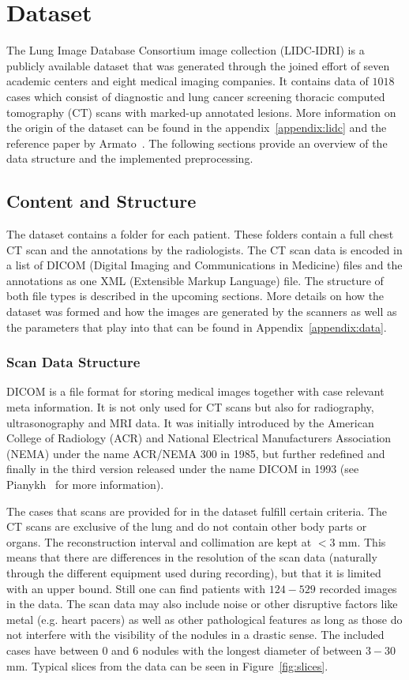 \documentclass[../Thesis.tex]{subfiles}
\begin{document}
\chapter{Dataset}\label{chap:data}
The Lung Image Database Consortium image collection (LIDC-IDRI) is a publicly available dataset that was generated through the joined effort of seven academic centers and eight medical imaging companies. It contains data of $1018$ cases which consist of diagnostic and lung cancer screening thoracic computed tomography (CT) scans with marked-up annotated lesions. More information on the origin of the dataset can be found in the appendix~\ref{appendix:lidc} and the reference paper by Armato~\cite{armato2011lung}. The following sections provide an overview of the data structure and the implemented preprocessing.

\section{Content and Structure}
The dataset contains a folder for each patient. These folders contain a full chest CT scan and the annotations by the radiologists. The CT scan data is encoded in a list of DICOM (Digital Imaging and Communications in Medicine) files and the annotations as one XML (Extensible Markup Language) file. The structure of both file types is described in the upcoming sections. More details on how the dataset was formed and how the images are generated by the scanners as well as the parameters that play into that can be found in Appendix~\ref{appendix:data}.

\subsection{Scan Data Structure}
DICOM is a file format for storing medical images together with case relevant meta information. It is not only used for CT scans but also for radiography, ultrasonography and MRI data. It was initially introduced by the American College of Radiology (ACR) and National Electrical Manufacturers Association (NEMA) under the name ACR/NEMA 300 in 1985, but further redefined and finally in the third version released under the name DICOM in 1993 (see Pianykh~\cite{pianykh2008} for more information).

The cases that scans are provided for in the dataset fulfill certain criteria. The CT scans are exclusive of the lung and do not contain other body parts or organs. The reconstruction interval and collimation are kept at $<3$ mm. This means that there are differences in the resolution of the scan data (naturally through the different equipment used during recording), but that it is limited with an upper bound. Still one can find patients with $124-529$ recorded images in the data. The scan data may also include noise or other disruptive factors like metal (e.g. heart pacers) as well as other pathological features as long as those do not interfere with the visibility of the nodules in a drastic sense. The included cases have between $0$ and $6$ nodules with the longest diameter of between $3-30$ mm. Typical slices from the data can be seen in Figure~\ref{fig:slices}.
\end{document}
